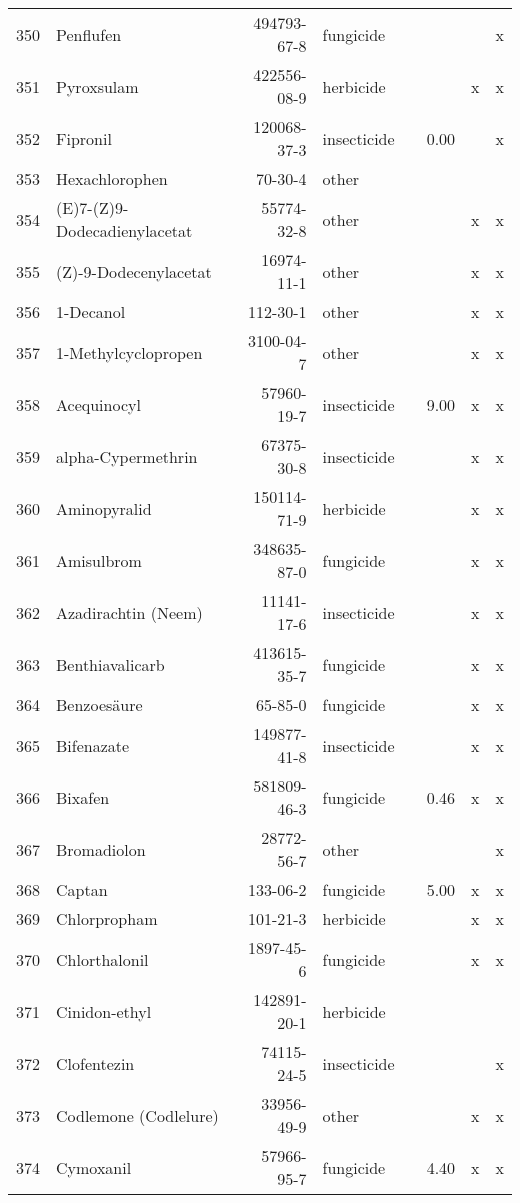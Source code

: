 \begin{longtable}{lp{4cm}rlp{1cm}p{1.5cm}p{1.5cm}p{1cm}}
  350 & Penflufen & 494793-67-8 & fungicide &  &  &  & x \\ 
  351 & Pyroxsulam & 422556-08-9 & herbicide &  &  & x & x \\ 
  352 & Fipronil & 120068-37-3 & insecticide &  & 0.00 &  & x \\ 
  353 & Hexachlorophen & 70-30-4 & other &  &  &  &  \\ 
  354 & (E)7-(Z)9-Dodecadienylacetat & 55774-32-8 & other &  &  & x & x \\ 
  355 & (Z)-9-Dodecenylacetat & 16974-11-1 & other &  &  & x & x \\ 
  356 & 1-Decanol & 112-30-1 & other &  &  & x & x \\ 
  357 & 1-Methylcyclopropen & 3100-04-7 & other &  &  & x & x \\ 
  358 & Acequinocyl & 57960-19-7 & insecticide &  & 9.00 & x & x \\ 
  359 & alpha-Cypermethrin & 67375-30-8 & insecticide &  &  & x & x \\ 
  360 & Aminopyralid & 150114-71-9 & herbicide &  &  & x & x \\ 
  361 & Amisulbrom & 348635-87-0 & fungicide &  &  & x & x \\ 
  362 & Azadirachtin (Neem) & 11141-17-6 & insecticide &  &  & x & x \\ 
  363 & Benthiavalicarb & 413615-35-7 & fungicide &  &  & x & x \\ 
  364 & Benzoesäure & 65-85-0 & fungicide &  &  & x & x \\ 
  365 & Bifenazate & 149877-41-8 & insecticide &  &  & x & x \\ 
  366 & Bixafen & 581809-46-3 & fungicide &  & 0.46 & x & x \\ 
  367 & Bromadiolon & 28772-56-7 & other &  &  &  & x \\ 
  368 & Captan & 133-06-2 & fungicide &  & 5.00 & x & x \\ 
  369 & Chlorpropham & 101-21-3 & herbicide &  &  & x & x \\ 
  370 & Chlorthalonil & 1897-45-6 & fungicide &  &  & x & x \\ 
  371 & Cinidon-ethyl & 142891-20-1 & herbicide &  &  &  &  \\ 
  372 & Clofentezin & 74115-24-5 & insecticide &  &  &  & x \\ 
  373 & Codlemone (Codlelure) & 33956-49-9 & other &  &  & x & x \\ 
  374 & Cymoxanil & 57966-95-7 & fungicide &  & 4.40 & x & x \\ 

\end{longtable}
